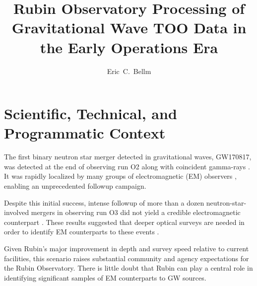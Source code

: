 \documentclass[DM,authoryear,toc]{lsstdoc}
\title{Rubin Observatory Processing of Gravitational Wave TOO Data in the Early Operations Era}
\author{%
Eric~C.~Bellm
}
\date{\vcsDate}
\begin{document}


\maketitle

\section{Scientific, Technical, and Programmatic Context}

The first binary neutron star merger detected in gravitational waves, GW170817, was detected at the end of observing run O2 \citep{2017PhRvL.119p1101A} along with coincident gamma-rays \citep{2017ApJ...848L..13A}.  
It was rapidly localized by many groups of electromagnetic (EM) observers \citep{2017ApJ...848L..12A}, enabling an unprecedented followup campaign.

Despite this initial success, intense followup of more than a dozen neutron-star-involved mergers in observing run O3 did not yield a credible electromagnetic counterpart \citep[e.g.,][]{2020ApJ...905..145K, 2022ApJ...927...50R, 2022MNRAS.509.3427D}.
These results suggested that deeper optical surveys are needed in order to identify EM counterparts to these events \citep[e.g.,][]{2020MNRAS.492..863C, 2021MNRAS.504.1294S}.

Given Rubin's major improvement in depth and survey speed relative to current facilities,  
this scenario raises substantial community and agency expectations for the Rubin Observatory.
There is little doubt that Rubin can play a central role in identifying significant samples of EM counterparts to GW sources.
\end{document}
